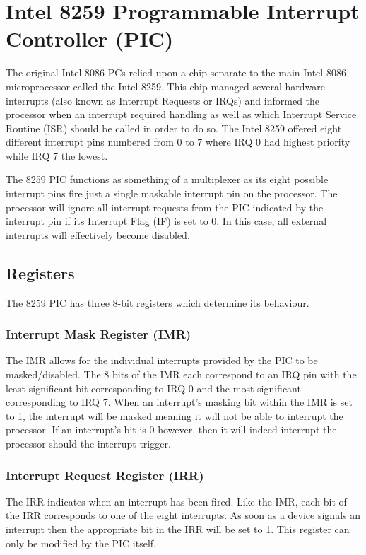 \section{Intel 8259 Programmable Interrupt Controller (PIC)}
	The original Intel 8086 PCs relied upon a chip separate to the main Intel 8086 microprocessor called the Intel 8259. This chip managed several hardware interrupts (also known as Interrupt Requests or IRQs) and informed the processor when an interrupt required handling as well as which Interrupt Service Routine (ISR) should be called in order to do so. The Intel 8259 offered eight different interrupt pins numbered from 0 to 7 where IRQ 0 had highest priority while IRQ 7 the lowest.

	The 8259 PIC functions as something of a multiplexer as its eight possible interrupt pins fire just a single maskable interrupt pin on the processor. The processor will ignore all interrupt requests from the PIC indicated by the interrupt pin if its Interrupt Flag (IF) is set to 0. In this case, all external interrupts will effectively become disabled.

	\subsection{Registers}
		The 8259 PIC has three 8-bit registers which determine its behaviour.

		\subsubsection{Interrupt Mask Register (IMR)}
			The IMR allows for the individual interrupts provided by the PIC to be masked/disabled. The 8 bits of the IMR each correspond to an IRQ pin with the least significant bit corresponding to IRQ 0 and the most significant corresponding to IRQ 7. When an interrupt's masking bit within the IMR is set to 1, the interrupt will be masked meaning it will not be able to interrupt the processor. If an interrupt's bit is 0 however, then it will indeed interrupt the processor should the interrupt trigger.

		\subsubsection{Interrupt Request Register (IRR)}
			The IRR indicates when an interrupt has been fired. Like the IMR, each bit of the IRR corresponds to one of the eight interrupts. As soon as a device signals an interrupt then the appropriate bit in the IRR will be set to 1. This register can only be modified by the PIC itself.

